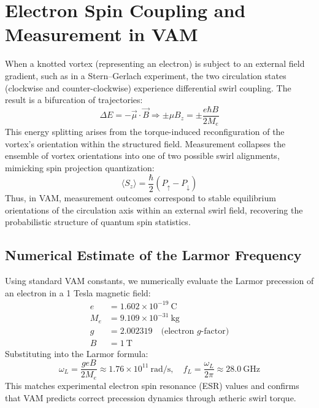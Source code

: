 \section*{Electron Spin Coupling and Measurement in VAM}
When a knotted vortex (representing an electron) is subject to an external field gradient, such as in a Stern–Gerlach experiment, the two circulation states (clockwise and counter-clockwise) experience differential swirl coupling. The result is a bifurcation of trajectories:
\begin{equation}
\Delta E = - \vec{\mu} \cdot \vec{B} \Rightarrow \pm \mu B_z = \pm \frac{e \hbar B}{2 M_e}
\end{equation}
This energy splitting arises from the torque-induced reconfiguration of the vortex's orientation within the structured field. Measurement collapses the ensemble of vortex orientations into one of two possible swirl alignments, mimicking spin projection quantization:
\begin{equation}
\langle S_z \rangle = \frac{\hbar}{2} \left( P_{\uparrow} - P_{\downarrow} \right)
\end{equation}
Thus, in VAM, measurement outcomes correspond to stable equilibrium orientations of the circulation axis within an external swirl field, recovering the probabilistic structure of quantum spin statistics.

\subsection*{Numerical Estimate of the Larmor Frequency}
Using standard VAM constants, we numerically evaluate the Larmor precession of an electron in a 1 Tesla magnetic field:
\begin{align*}
    e &= 1.602 \times 10^{-19}~\text{C} \\
    M_e &= 9.109 \times 10^{-31}~\text{kg} \\
    g &= 2.002319 \quad \text{(electron $g$-factor)} \\
    B &= 1~\text{T}
\end{align*}
Substituting into the Larmor formula:
\begin{equation}
    \omega_L = \frac{g e B}{2 M_e} \approx 1.76 \times 10^{11}~\text{rad/s}, \quad
    f_L = \frac{\omega_L}{2\pi} \approx 28.0~\text{GHz}
\end{equation}
This matches experimental electron spin resonance (ESR) values and confirms that VAM predicts correct precession dynamics through ætheric swirl torque.

